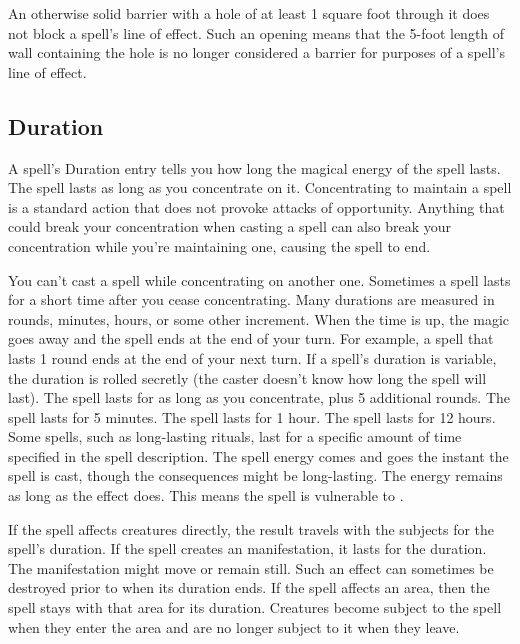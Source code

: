 An otherwise solid barrier with a hole of at least 1 square foot through it does not block a spell's line of effect. Such an opening means that the 5-foot length of wall containing the hole is no longer considered a barrier for purposes of a spell's line of effect.

\subsection{Duration}
A spell's Duration entry tells you how long the magical energy of the spell lasts.
 The spell lasts as long as you concentrate on it. Concentrating to maintain a spell is a standard action that does not provoke attacks of opportunity. Anything that could break your concentration when casting a spell can also break your concentration while you're maintaining one, causing the spell to end.

You can't cast a spell while concentrating on another one. Sometimes a spell lasts for a short time after you cease concentrating.
 Many durations are measured in rounds, minutes, hours, or some other increment. When the time is up, the magic goes away and the spell ends at the end of your turn. For example, a spell that lasts 1 round ends at the end of your next turn. If a spell's duration is variable, the duration is rolled secretly (the caster doesn't know how long the spell will last).
 The spell lasts for as long as you concentrate, plus 5 additional rounds.
 The spell lasts for 5 minutes.
 The spell lasts for 1 hour.
 The spell lasts for 12 hours.
 Some spells, such as long-lasting rituals, last for a specific amount of time specified in the spell description.
 The spell energy comes and goes the instant the spell is cast, though the consequences might be long-lasting.
 The energy remains as long as the effect does. This means the spell is vulnerable to .

 If the spell affects creatures directly, the result travels with the subjects for the spell's duration. If the spell creates an manifestation, it lasts for the duration. The manifestation might move or remain still. Such an effect can sometimes be destroyed prior to when its duration ends. If the spell affects an area, then the spell stays with that area for its duration. Creatures become subject to the spell when they enter the area and are no longer subject to it when they leave.

